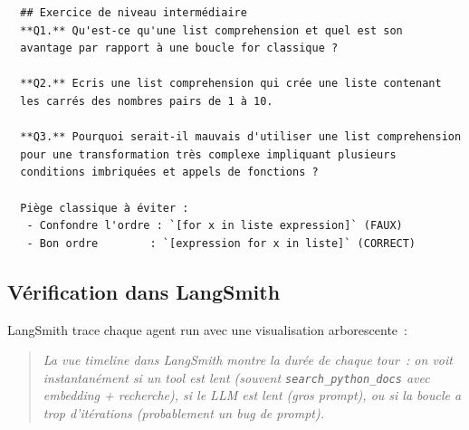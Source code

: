 \documentclass[11pt,a4paper]{article}
\begin{document}
\begin{tcolorbox}[
  colback=white,
  colframe=black!50,
  coltitle=black,
  fonttitle=\footnotesize\bfseries,
  fontupper=\footnotesize,
  title=Sortie de l'exécution,
  breakable,
]
\begin{verbatim}
  ## Exercice de niveau intermédiaire
  **Q1.** Qu'est-ce qu'une list comprehension et quel est son
  avantage par rapport à une boucle for classique ?

  **Q2.** Ecris une list comprehension qui crée une liste contenant
  les carrés des nombres pairs de 1 à 10.

  **Q3.** Pourquoi serait-il mauvais d'utiliser une list comprehension
  pour une transformation très complexe impliquant plusieurs
  conditions imbriquées et appels de fonctions ?

  Piège classique à éviter :
   - Confondre l'ordre : `[for x in liste expression]` (FAUX)
   - Bon ordre        : `[expression for x in liste]` (CORRECT)
\end{verbatim}
\end{tcolorbox}

\subsection{Vérification dans LangSmith}

LangSmith trace chaque agent run avec une visualisation arborescente~:

\begin{center}
\end{center}

\begin{quote}\itshape
La vue \emph{timeline} dans LangSmith montre la durée de chaque tour~:
on voit instantanément si un tool est lent (souvent
\texttt{search\_python\_docs} avec embedding + recherche), si le LLM est
lent (gros prompt), ou si la boucle a \emph{trop} d'itérations
(probablement un bug de prompt).
\end{quote}
\end{document}
